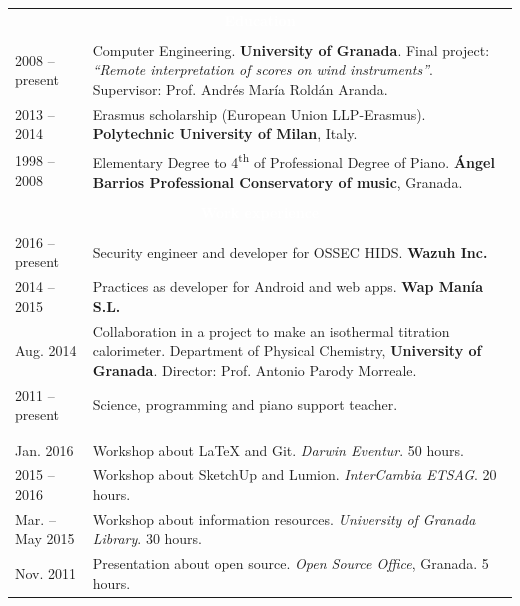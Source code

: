 \documentclass[12pt,a4paper]{article}
\newcommand{\header}[1]{\multicolumn{2}{c}{\cellcolor{black} \textcolor{white} {\bfseries #1}} \\ \\[-12pt]}
\begin{document}
	\begin{longtable}{p{} p{}}
		\header{Education}
		2008 -- present & Computer Engineering. \textbf{University of Granada}. \newline
		Final project: \textit{``Remote interpretation of scores on wind 
		instruments''}. \newline
		Supervisor: Prof. Andrés María Roldán Aranda. \\
		2013 -- 2014 & Erasmus scholarship (European Union LLP-Erasmus). \newline
		\textbf{Polytechnic University of Milan}, Italy. \\
		1998 -- 2008 & Elementary Degree to 4\textsuperscript{th} of Professional
		Degree of Piano. \newline
		\textbf{Ángel Barrios Professional Conservatory of music}, Granada. \\
		\\
		\header{Work experience}
		2016 -- present & Security engineer and developer for OSSEC HIDS. \newline
		\textbf{Wazuh Inc.} \\
		2014 -- 2015 & Practices as developer for Android and web apps. \newline
		\textbf{Wap Manía S.L.}\\
		Aug. 2014 & Collaboration in a project to make an isothermal titration 
		calorimeter. \newline
		Department of Physical Chemistry, \textbf{University of Granada}. \newline
		Director: Prof. Antonio Parody Morreale. \\
		2011 -- present & Science, programming and piano support teacher. \\
		\newpage
		\header{Courses and events}
		Jan. 2016 & Workshop about LaTeX and Git. \newline
		\textit{Darwin Eventur}. 50 hours. \\
		2015 -- 2016 & Workshop about SketchUp and Lumion. \newline
		\textit{InterCambia ETSAG}. 20 hours. \\
		Mar. -- May 2015 & Workshop about information resources. \newline
		\textit{University of Granada Library}. 30 hours. \\
		Nov. 2011 & Presentation about open source. \newline
		\textit{Open Source Office}, Granada. 5 hours. \\

\end{longtable}
\end{document}
